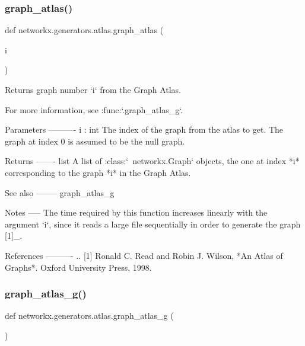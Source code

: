 \subsubsection{\texorpdfstring{graph\+\_\+atlas()}{graph\_atlas()}}
{\footnotesize\ttfamily def networkx.\+generators.\+atlas.\+graph\+\_\+atlas (\begin{DoxyParamCaption}\item[{}]{i }\end{DoxyParamCaption})}

\begin{DoxyVerb}Returns graph number `i` from the Graph Atlas.

For more information, see :func:`.graph_atlas_g`.

Parameters
----------
i : int
    The index of the graph from the atlas to get. The graph at index
    0 is assumed to be the null graph.

Returns
-------
list
    A list of :class:`~networkx.Graph` objects, the one at index *i*
    corresponding to the graph *i* in the Graph Atlas.

See also
--------
graph_atlas_g

Notes
-----
The time required by this function increases linearly with the
argument `i`, since it reads a large file sequentially in order to
generate the graph [1]_.

References
----------
.. [1] Ronald C. Read and Robin J. Wilson, *An Atlas of Graphs*.
       Oxford University Press, 1998.\end{DoxyVerb}
 \mbox{\label{namespacenetworkx_1_1generators_1_1atlas_a6a2c863330707267be7bd0e301e25832}} 
\subsubsection{\texorpdfstring{graph\+\_\+atlas\+\_\+g()}{graph\_atlas\_g()}}
{\footnotesize\ttfamily def networkx.\+generators.\+atlas.\+graph\+\_\+atlas\+\_\+g (\begin{DoxyParamCaption}{ }\end{DoxyParamCaption})}

